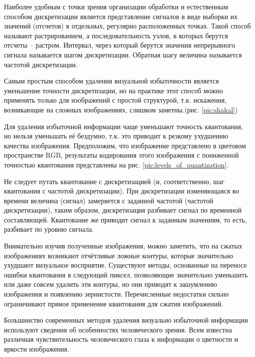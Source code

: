 Наиболее удобным с точки зрения организации обработки и естественным способом дискретизации является представление сигналов в виде выборки их значений (отсчетов) в отдельных, регулярно расположенных точках. Такой способ называют растрированием, а последовательность узлов, в которых берутся отсчеты – растром. Интервал, через который берутся значения непрерывного сигнала называется шагом дискретизации. Обратная шагу величина называется частотой дискретизации.

Самым простым способом удаления визуальной избыточности является уменьшение точности дискретизации, но на практике этот способ можно применять только для изображений с простой структурой, т.к. искажения, возникающие на сложных изображениях, слишком заметны.(рис. \ref{pic:shakal})


Для удаления избыточной информации чаще уменьшают точность квантования, но нельзя уменьшать её бездумно, т.к. это приводит к резкому ухудшению качества изображения. Предположим, что изображение представлено в цветовом пространстве RGB, результаты кодирования этого изображения с пониженной точностью квантования представлены на рис. \ref{pic:levels_of_quantization}.


Не следует путать квантование с дискретизацией (и, соответственно, шаг квантования с частотой дискретизации). При дискретизации изменяющаяся во времени величина (сигнал) замеряется с заданной частотой (частотой дискретизации), таким образом, дискретизация разбивает сигнал по временной составляющей. Квантование же приводит сигнал к заданным значениям, то есть, разбивает по уровню сигнала.

Внимательно изучив полученные изображения, можно заметить, что на сжатых изображениях возникают отчётливые ложные контуры, которые значительно ухудшают визуальное восприятие. Существуют методы, основанные на переносе ошибки квантования в следующий пиксел, позволяющие значительно уменьшить или даже совсем удалить эти контуры, но они приводят к зашумлению изображения и появлению зернистости. Перечисленные недостатки сильно ограничивают прямое применение квантования для сжатия изображений.

Большинство современных методов удаления визуально избыточной информации используют сведения об особенностях человеческого зрения. Всем известна различная чувствительность человеческого глаза к информации о цветности и яркости изображения.


